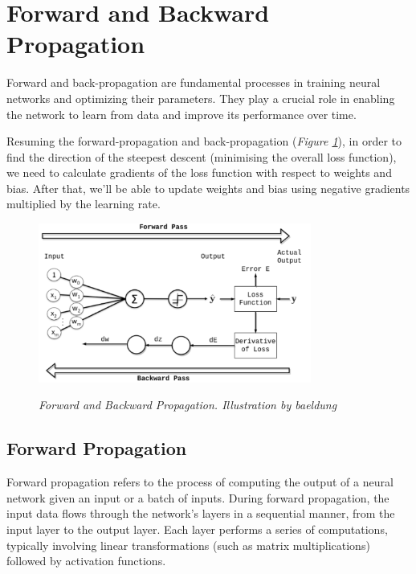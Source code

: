 \newpage

\section{Forward and Backward Propagation}

Forward and back-propagation are fundamental processes in training neural
networks and optimizing their parameters. They play a crucial role in enabling
the network to learn from data and improve its performance over time. \newline

Resuming the forward-propagation and back-propagation (\textit{Figure
\ref{fig:forward-and-back-propagation}}), in order to find the direction of the
steepest descent (minimising the overall loss function), we need to calculate
gradients of the loss function with respect to weights and bias. After that,
we’ll be able to update weights and bias using negative gradients multiplied by
the learning rate.

\begin{figure}[H]
  \centering
  \includegraphics[width=0.8\textwidth]{imatges/preliminaries/front-and-back-prop.png}
  \caption[Forward and Backward Propagation]{\textit{Forward and Backward Propagation. Illustration by baeldung}}
  {\label{fig:forward-and-back-propagation}}
\end{figure}


\subsection{Forward Propagation}

Forward propagation refers to the process of computing the output of a neural
network given an input or a batch of inputs. During forward propagation, the
input data flows through the network's layers in a sequential manner, from the
input layer to the output layer. Each layer performs a series of computations,
typically involving linear transformations (such as matrix multiplications)
followed by activation functions. \newline

